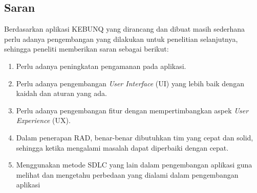 \begin{flushleft}
\begin{justify}
        \section{Saran}
        Berdasarkan aplikasi KEBUNQ yang dirancang dan dibuat masih sederhana perlu adanya pengembangan yang dilakukan untuk penelitian selanjutnya, sehingga peneliti memberikan saran sebagai berikut:
        \begin{enumerate}
            \item Perlu adanya peningkatan pengamanan pada aplikasi.
            \item Perlu adanya pengembangan \emph{User Interface} (UI) yang lebih baik dengan kaidah dan aturan yang ada.
            \item Perlu adanya pengembangan fitur dengan mempertimbangkan aspek \emph{User Experience} (UX).
            \item Dalam penerapan RAD, benar-benar dibutuhkan tim yang cepat dan solid, sehingga ketika mengalami masalah dapat diperbaiki dengan cepat.
            \item Menggunakan metode SDLC yang lain dalam pengembangan aplikasi guna melihat dan mengetahu perbedaan yang dialami dalam pengembangan aplikasi
        \end{enumerate}

            
    \end{justify}
        
\end{flushleft}

\newpage
